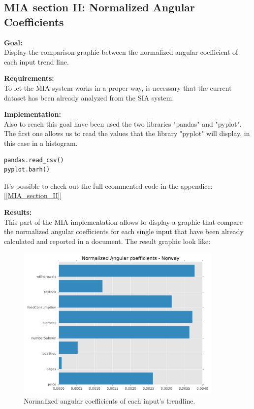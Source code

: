 \subsection{MIA section II: Normalized Angular Coefficients}
\textbf{Goal:}\\
Display the comparison graphic between the normalized angular coefficient of each input trend line.

\textbf{Requirements:}\\
To let the MIA system works in a proper way, is necessary that the current dataset has been already analyzed from the SIA system.

\textbf{Implementation:}\\
Also to reach this goal have been used the two libraries "pandas" and "pyplot". The first one allows us to read the values that the library "pyplot" will display, in this case in a histogram.
\begin{lstlisting}
pandas.read_csv()
pyplot.barh()
\end{lstlisting}

It's possible to check out the full ccommented code in the appendice: [\ref{MIA_section_II}]

\textbf{Results:} \\
This part of the MIA implementation allows to display a graphic that compare the normalized angular coefficients for each single input that have been already calculated and reported in a document. The result graphic look like:

\begin{figure}[H]
	\centering
    \includegraphics[width=0.90\textwidth]{Files/Norm_Ang_Coeffs.pdf}
    \caption{Normalized angular coefficients of each input's trendline.}
\end{figure}


